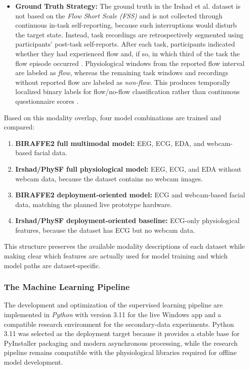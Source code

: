 \begin{enumerate}
\begin{itemize}
        \item \textbf{Ground Truth Strategy:} The ground truth in the Irshad et al. dataset is not based on the \textit{Flow Short Scale (FSS)} and is not collected through continuous in-task self-reporting, because such interruptions would disturb the target state. Instead, task recordings are retrospectively segmented using participants' post-task self-reports. After each task, participants indicated whether they had experienced flow and, if so, in which third of the task the flow episode occurred \autocite{irshad2023wearable}. Physiological windows from the reported flow interval are labeled as \textit{flow}, whereas the remaining task windows and recordings without reported flow are labeled as \textit{non-flow}. This produces temporally localized binary labels for flow/no-flow classification rather than continuous questionnaire scores \autocite{irshad2023wearable}.
    \end{itemize}
\end{enumerate}


\noindent
Based on this modality overlap, four model combinations are trained and compared:
\begin{enumerate}
    \item \textbf{BIRAFFE2 full multimodal model:} EEG, ECG, EDA, and webcam-based facial data.
    \item \textbf{Irshad/PhySF full physiological model:} EEG, ECG, and EDA without webcam data, because the dataset contains no webcam images.
    \item \textbf{BIRAFFE2 deployment-oriented model:} ECG and webcam-based facial data, matching the planned live prototype hardware.
    \item \textbf{Irshad/PhySF deployment-oriented baseline:} ECG-only physiological features, because the dataset has ECG but no webcam data.
\end{enumerate}
This structure preserves the available modality descriptions of each dataset while making clear which features are actually used for model training and which model paths are dataset-specific.

\subsubsection{The Machine Learning Pipeline}
The development and optimization of the supervised learning pipeline are implemented in \textit{Python} with version 3.11 for the live Windows app and a compatible research environment for the secondary-data experiments. Python 3.11 was selected as the deployment target because it provides a stable base for PyInstaller packaging and modern asynchronous processing, while the research pipeline remains compatible with the physiological libraries required for offline model development.

